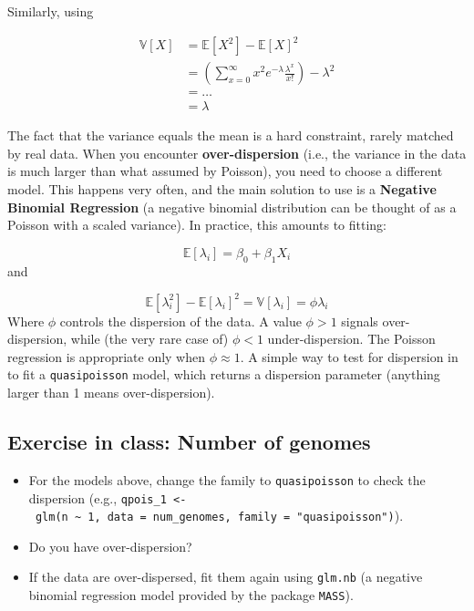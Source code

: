 \documentclass[
  letterpaper,
  DIV=11,
  numbers=noendperiod]{scrreprt}
\providecommand{\tightlist}{%
  \setlength{\itemsep}{0pt}\setlength{\parskip}{0pt}}\usepackage{longtable,booktabs,array}
\begin{document}
Similarly, using

\[
\begin{aligned}
\mathbb V[X] &= \mathbb E[X^2]-\mathbb E[X]^2\\
&= \left(\sum_{x = 0}^{\infty} x^2 e^{-\lambda} \frac{\lambda^x}{x!} \right) - \lambda^2 \\
&= \ldots\\
&= \lambda
\end{aligned}
\]

The fact that the variance equals the mean is a hard constraint, rarely
matched by real data. When you encounter \textbf{over-dispersion} (i.e.,
the variance in the data is much larger than what assumed by Poisson),
you need to choose a different model. This happens very often, and the
main solution to use is a \textbf{Negative Binomial Regression} (a
negative binomial distribution can be thought of as a Poisson with a
scaled variance). In practice, this amounts to fitting:

\[
\mathbb E[\lambda_i] = \beta_0 + \beta_1 X_i
\] and

\[
\mathbb E[\lambda_i^2] - \mathbb E[\lambda_i]^2 = \mathbb V[\lambda_i] = \phi \lambda_i
\] Where \(\phi\) controls the dispersion of the data. A value
\(\phi > 1\) signals over-dispersion, while (the very rare case of)
\(\phi < 1\) under-dispersion. The Poisson regression is appropriate
only when \(\phi \approx 1\). A simple way to test for dispersion in to
fit a \texttt{quasipoisson} model, which returns a dispersion parameter
(anything larger than 1 means over-dispersion).

\subsection{Exercise in class: Number of
genomes}\label{exercise-in-class-number-of-genomes-1}

\begin{itemize}
\tightlist
\item
  For the models above, change the family to \texttt{quasipoisson} to
  check the dispersion (e.g.,
  \texttt{qpois\_1\ \textless{}-\ glm(n\ \textasciitilde{}\ 1,\ data\ =\ num\_genomes,\ family\ =\ "quasipoisson")}).
\item
  Do you have over-dispersion?
\item
  If the data are over-dispersed, fit them again using \texttt{glm.nb}
  (a negative binomial regression model provided by the package
  \texttt{MASS}).
\end{itemize}
\end{document}
